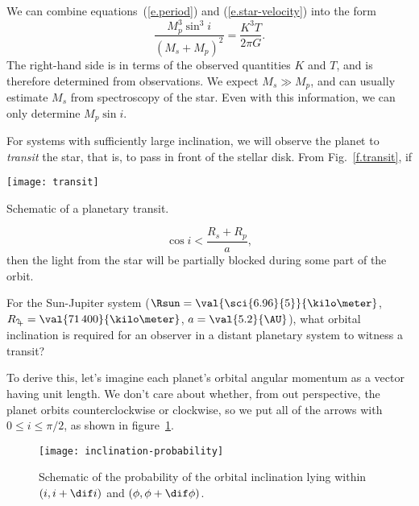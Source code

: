 We can combine equations~(\ref{e.period}) and (\ref{e.star-velocity}) into the form
\begin{equation}\label{e.mass-fcn}
	\frac{M_{p}^{3}\sin^{3}i}{(M_{s}+M_{p})^{2}} = \frac{K^{3}T}{2\pi G}.
\end{equation}
The right-hand side is in terms of the observed quantities $K$ and $T$, and is therefore determined from observations.  We expect $M_{s} \gg M_{p}$, and can usually estimate $M_{s}$ from spectroscopy of the star.  Even with this information, we can only determine $M_{p}\sin i$.

For systems with sufficiently large inclination, we will observe the planet to \emph{transit} the star, that is, to pass in front of the stellar disk. From Fig.~\ref{f.transit}, if
\begin{marginfigure}
\texttt{[image: transit]}
\caption[Schematic of a planetary transit]{Schematic of a planetary transit.}
\label{f.transit}
\end{marginfigure}
\[	\cos i < \frac{R_{s}+R_{p}}{a},	\]
then the light from the star will be partially blocked during some part of the orbit.

\begin{exercisebox}
For the Sun-Jupiter system ($\Rsun = \val{\sci{6.96}{5}}{\kilo\meter}$, $R_{\jupiter}=\val{71\,400}{\kilo\meter}$, $a = \val{5.2}{\AU}$), what orbital inclination is required for an observer in a distant planetary system to witness a transit?
\end{exercisebox}

To derive this, let's imagine each planet's orbital angular momentum as a vector having unit length.  We don't care about whether, from out perspective, the planet orbits counterclockwise or clockwise, so we put all of the arrows with $0\le i\le \pi/2$, as shown in figure~\ref{f.inclination-probability}.  

\begin{figure}[ht]
\texttt{[image: inclination-probability]}
\caption[Schematic of the probability distribution of orbital inclination]{Schematic of the probability of the orbital inclination lying within $(i,i+\dif i)$ and $(\phi,\phi+\dif\phi)$.}
\label{f.inclination-probability}
\end{figure}

